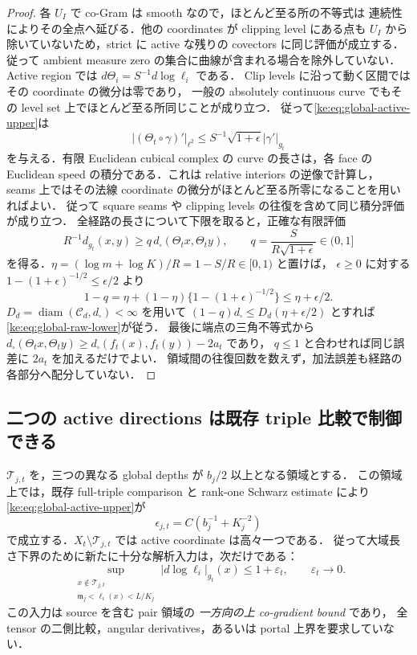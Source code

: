 \begin{proof}
各 $U_I$ で co-Gram は smooth なので，ほとんど至る所の不等式は
連続性によりその全点へ延びる．他の coordinates が clipping level にある点も
$U_I$ から除いていないため，strict に active な残りの covectors に同じ評価が成立する．
従って ambient measure zero の集合に曲線が含まれる場合を除外していない．
Active region では $d\Theta_i=S^{-1}d\log\ell_i$ である．
Clip levels に沿って動く区間ではその coordinate の微分は零であり，
一般の absolutely continuous curve でもその level set 上でほとんど至る所同じことが成り立つ．
従って\eqref{ke:eq:global-active-upper}は
\[
 |(\Theta_t\circ\gamma)'|_{\ell^2}
 \le S^{-1}\sqrt{1+\epsilon}|\gamma'|_{g_t}
\]
を与える．有限 Euclidean cubical complex の curve の長さは，各 face の
Euclidean speed の積分である．これは relative interiors の逆像で計算し，
seams 上ではその法線 coordinate の微分がほとんど至る所零になることを用いればよい．
従って square seams や clipping levels の往復を含めて同じ積分評価が成り立つ．
全経路の長さについて下限を取ると，正確な有限評価
\[
 R^{-1}d_{g_t}(x,y)\ge q\,d_\square(\Theta_t x,\Theta_t y),
 \qquad q=\frac{S}{R\sqrt{1+\epsilon}}\in(0,1]
\]
を得る．$\eta=(\log m+\log K)/R=1-S/R\in[0,1)$ と置けば，
$\epsilon\ge0$ に対する $1-(1+\epsilon)^{-1/2}\le\epsilon/2$ より
\[
 1-q
 =\eta+(1-\eta)\{1-(1+\epsilon)^{-1/2}\}
 \le\eta+\epsilon/2.
\]
$D_d=\operatorname{diam}(\mathcal C_d,d_\square)<\infty$ を用いて
$(1-q)d_\square\le D_d(\eta+\epsilon/2)$ とすれば
\eqref{ke:eq:global-raw-lower}が従う．
最後に端点の三角不等式から
$d_\square(\Theta_t x,\Theta_t y)\ge d_\square(f_t(x),f_t(y))-2a_t$ であり，
$q\le1$ と合わせれば同じ誤差に $2a_t$ を加えるだけでよい．
領域間の往復回数を数えず，加法誤差も経路の各部分へ配分していない．
\end{proof}

\subsection{二つの active directions は既存 triple 比較で制御できる}

\begin{proposition}
\label{ke:global-lower-rank-one-reduction}
$\mathcal T_{j,t}$ を，三つの異なる global depths が $b_j/2$ 以上となる領域とする．
この領域上では，既存 full-triple comparison と rank-one Schwarz estimate により
\eqref{ke:eq:global-active-upper}が
\[
 \epsilon_{j,t}=C(b_j^{-1}+K_j^{-2})
\]
で成立する．$X_t\setminus\mathcal T_{j,t}$ では active coordinate は高々一つである．
従って大域長さ下界のために新たに十分な解析入力は，次だけである：
\begin{equation}\label{ke:eq:single-active-normal-input}
 \sup_{\substack{x\notin\mathcal T_{j,t}\\\mathfrak m_j<\ell_i(x)<L/K_j}}
       |d\log\ell_i|_{g_t}(x)\le1+\varepsilon_t,
 \qquad \varepsilon_t\longrightarrow0.
\end{equation}
この入力は source を含む pair 領域の \emph{一方向の上 co-gradient bound} であり，
全 tensor の二側比較，angular derivatives，あるいは portal 上界を要求していない．
\end{proposition}


